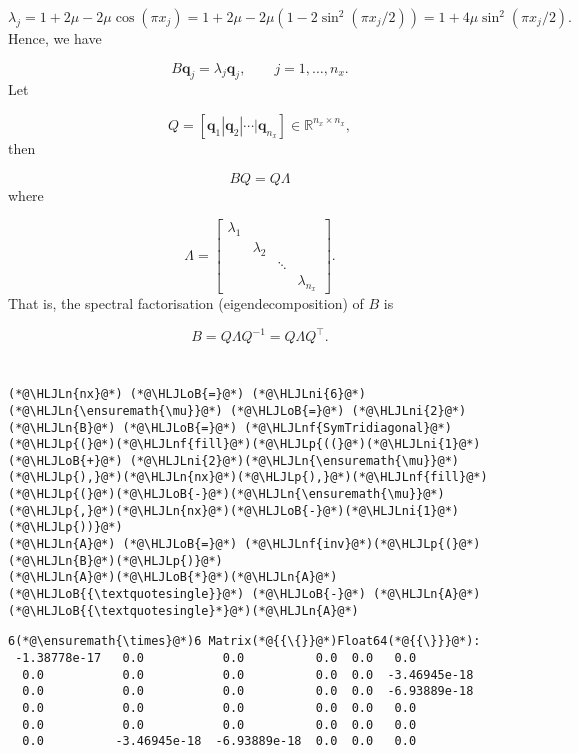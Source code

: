 \documentclass[12pt,a4paper]{article}
\newcommand{\HLJLn}[1]{#1}
\newcommand{\HLJLnf}[1]{\textcolor[RGB]{66,102,213}{#1}}
\newcommand{\HLJLni}[1]{\textcolor[RGB]{59,151,46}{#1}}
\newcommand{\HLJLoB}[1]{\textcolor[RGB]{102,102,102}{\textbf{#1}}}
\newcommand{\HLJLp}[1]{#1}
\begin{document}
\[
\lambda_j = 1 + 2\mu - 2\mu\cos\left(\pi x_j  \right) = 1 + 2\mu -2\mu(1 - 2\sin^2(\pi x_j/2)) = 1 + 4\mu\sin^2(\pi x_j/2).
\]
Hence, we have

\[
B\mathbf{q}_j = \lambda_j\mathbf{q}_j, \qquad j = 1, \ldots, n_x.
\]
Let

\[
Q = \left[\mathbf{q}_1 |  \mathbf{q}_2 | \cdots | \mathbf{q}_{n_x}  \right] \in \mathbb{R}^{n_x \times n_x},
\]
then

\[
BQ = Q\Lambda
\]
where

\[
\Lambda = \begin{bmatrix}
\lambda_1 & & & \\
& \lambda_2 & & \\
 & & \ddots &  \\
&  & & \lambda_{n_x}
\end{bmatrix}.
\]
That is, the spectral factorisation (eigendecomposition) of $B$ is

\[
B = Q\Lambda Q^{-1} =  Q\Lambda Q^{\top}.
\]

\begin{lstlisting}

\end{lstlisting}


\begin{lstlisting}

\end{lstlisting}


\begin{lstlisting}
(*@\HLJLn{nx}@*) (*@\HLJLoB{=}@*) (*@\HLJLni{6}@*)
(*@\HLJLn{\ensuremath{\mu}}@*) (*@\HLJLoB{=}@*) (*@\HLJLni{2}@*)
(*@\HLJLn{B}@*) (*@\HLJLoB{=}@*) (*@\HLJLnf{SymTridiagonal}@*)(*@\HLJLp{(}@*)(*@\HLJLnf{fill}@*)(*@\HLJLp{((}@*)(*@\HLJLni{1}@*) (*@\HLJLoB{+}@*) (*@\HLJLni{2}@*)(*@\HLJLn{\ensuremath{\mu}}@*)(*@\HLJLp{),}@*)(*@\HLJLn{nx}@*)(*@\HLJLp{),}@*)(*@\HLJLnf{fill}@*)(*@\HLJLp{(}@*)(*@\HLJLoB{-}@*)(*@\HLJLn{\ensuremath{\mu}}@*)(*@\HLJLp{,}@*)(*@\HLJLn{nx}@*)(*@\HLJLoB{-}@*)(*@\HLJLni{1}@*)(*@\HLJLp{))}@*)
(*@\HLJLn{A}@*) (*@\HLJLoB{=}@*) (*@\HLJLnf{inv}@*)(*@\HLJLp{(}@*)(*@\HLJLn{B}@*)(*@\HLJLp{)}@*)
(*@\HLJLn{A}@*)(*@\HLJLoB{*}@*)(*@\HLJLn{A}@*)(*@\HLJLoB{{\textquotesingle}}@*) (*@\HLJLoB{-}@*) (*@\HLJLn{A}@*)(*@\HLJLoB{{\textquotesingle}*}@*)(*@\HLJLn{A}@*)
\end{lstlisting}

\begin{lstlisting}
6(*@\ensuremath{\times}@*)6 Matrix(*@{{\{}}@*)Float64(*@{{\}}}@*):
 -1.38778e-17   0.0           0.0          0.0  0.0   0.0
  0.0           0.0           0.0          0.0  0.0  -3.46945e-18
  0.0           0.0           0.0          0.0  0.0  -6.93889e-18
  0.0           0.0           0.0          0.0  0.0   0.0
  0.0           0.0           0.0          0.0  0.0   0.0
  0.0          -3.46945e-18  -6.93889e-18  0.0  0.0   0.0
\end{lstlisting}
\end{document}
